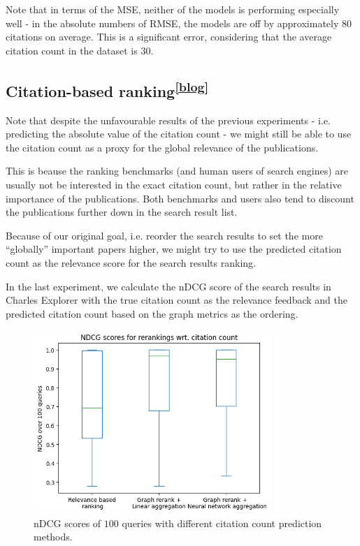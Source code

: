 Note that in terms of the \ac{MSE}, neither of the models is performing especially well - in the absolute numbers of \ac{RMSE}, the models are off by approximately $80$ citations on average.
This is a significant error, considering that the average citation count in the dataset is $30$.

\subsection[Citation-based ranking]{Citation-based ranking\textsuperscript{\href{https://jindrich.bar/edu/thesis-blog/citation-count/\#citation-based-ranking}{[blog]}}}\label{citation-based-ranking}

Note that despite the unfavourable results of the previous experiments - i.e. predicting the absolute value of the citation count - we might still be able to use the citation count as a proxy for the global relevance of the publications.

This is beause the ranking benchmarks (and human users of search engines) are usually not be interested in the exact citation count, but rather in the relative importance of the publications. 
Both benchmarks and users also tend to discount the publications further down in the search result list.

Because of our original goal, i.e. reorder the search results to set the more “globally” important papers higher,
we might try to use the predicted citation count as the relevance score for the search results ranking.

In the last experiment, we calculate the nDCG score of the search results in Charles Explorer with the true citation count as the relevance feedback and the predicted citation count based on the graph metrics as the ordering.

\begin{figure}[ht!]
    \captionsetup{width=.9\linewidth}
    \includegraphics[width=0.8\textwidth]{../img/ndcg_citations.png}
    \centering
    \caption{nDCG scores of $100$ queries with different citation count prediction methods.}
\end{figure}

